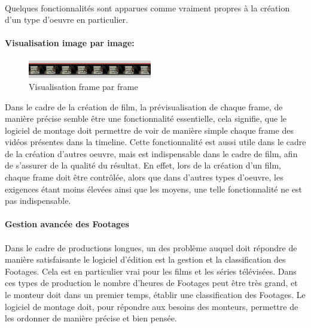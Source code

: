 \paragraph{}
Quelques fonctionnalités sont apparues comme vraiment propres à la création
d'un type d'oeuvre en particulier.

\paragraph{Visualisation image par image:}
\begin{figure}
    \begin{center}
      \includegraphics[width=0.48\textwidth]{images/frameByFrame}
    \end{center} \caption{Visualisation frame par frame} \label{Yes}
\end{figure}

Dans le cadre de la création de film, la prévisualisation de chaque frame,
de manière précise semble être une fonctionnalité essentielle,
cela signifie, que le logiciel de montage doit permettre de
voir de manière simple chaque frame des vidéos présentes dans la
timeline. Cette fonctionnalité est aussi utile dans le cadre de
la création d'autres oeuvre, mais est indispensable dans le cadre
de film, afin de s'assurer de la qualité du résultat. En effet,
lors de la création d'un film, chaque frame doit être contrôlée,
alors que dans d'autres types d'oeuvre, les exigences étant moins
élevées ainsi que les moyens, une telle fonctionnalité ne est pas
indispensable.

\paragraph{Gestion avancée des Footages}
\paragraph{}
Dans le cadre de productions longues, un des problème auquel doit répondre de
manière satisfaisante le logiciel d'édition est la gestion et la classification
des Footages. Cela est en particulier vrai pour les films et les séries télévisées.
Dans ces types de production le nombre d'heures de Footages peut être très grand, et
le monteur doit dans un premier temps, établir une classification
des Footages. Le logiciel de montage doit, pour répondre aux besoins des monteurs,
permettre de les ordonner de manière précise et bien pensée.

